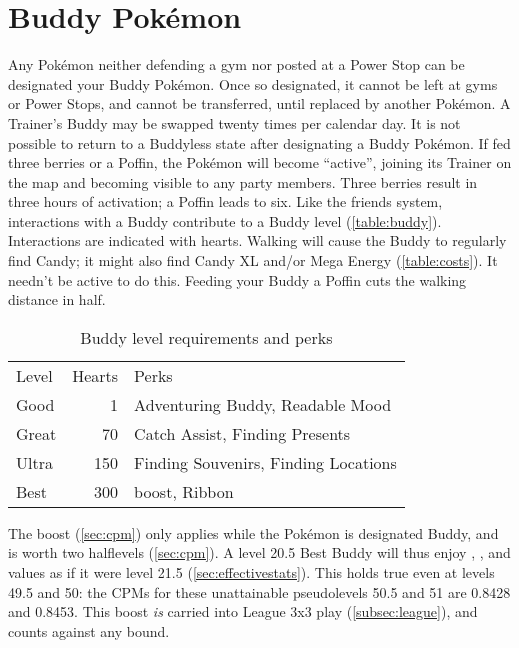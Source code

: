 \section{Buddy Pokémon\label{sec:buddies}}
Any Pokémon neither defending a gym nor posted at a Power Stop can be designated your Buddy Pokémon.
Once so designated, it cannot be left at gyms or Power Stops, and cannot be transferred,
  until replaced by another Pokémon.
A Trainer's Buddy may be swapped twenty times per calendar day.
It is not possible to return to a Buddyless state after designating a Buddy Pokémon.
If fed three berries or a Poffin, the Pokémon will become ``active'',
  joining its Trainer on the map and becoming visible to any party members.
Three berries result in three hours of activation; a Poffin leads to six.
Like the friends system, interactions with a Buddy contribute to a Buddy level (\autoref{table:buddy}).
Interactions are indicated with hearts.
Walking will cause the Buddy to regularly find Candy; it might also find Candy XL
  and/or Mega Energy (\autoref{table:costs}).
It needn't be active to do this.
Feeding your Buddy a Poffin cuts the walking distance in half.
\begin{table}
\centering
\begin{tabular}{lrl}
Level & Hearts & Perks\\
\Midrule
Good & 1 & Adventuring Buddy, Readable Mood\\
Great & 70 & Catch Assist, Finding Presents\\
Ultra & 150 & Finding Souvenirs, Finding Locations\\
Best & 300 & \CPM{} boost, Ribbon\\
\end{tabular}
\caption{Buddy level requirements and perks\label{table:buddy}}
\end{table}
The \CPM{} boost (\autoref{sec:cpm}) only applies while the Pokémon is designated Buddy,
  and is worth two halflevels (\autoref{sec:cpm}).
A level 20.5 Best Buddy will thus enjoy , , and  values
  as if it were level 21.5 (\autoref{sec:effectivestats}).
This holds true even at levels 49.5 and 50: the CPMs for these unattainable
  pseudolevels 50.5 and 51 are 0.8428 and 0.8453.
This boost \textit{is} carried into League 3x3 play (\autoref{subsec:league}),
  and counts against any \CP{} bound.

